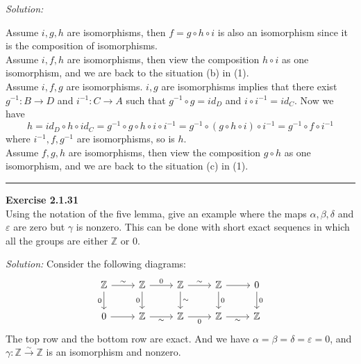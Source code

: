 \documentclass[a4paper, 12pt]{article}
\newenvironment{problem}[2][Exercise]
    { \begin{mdframed}[backgroundcolor=gray!20] \textbf{#1 #2} \\}
    {  \end{mdframed}}
\newenvironment{solution}
    {\textit{Solution:}}
    {}
\begin{document}
\begin{solution}
\begin{enumerate}[(1)]
Assume \(i,g,h\) are isomorphisms, then \(f=g\circ h\circ i\) is also an isomorphism since it is the composition of isomorphisms.\\ 
Assume \(i,f,h\) are isomorphisms, then view the composition \(h\circ i\) as one isomorphism, and we are back to the situation (b) in (1).\\ 
Assume \(i,f,g\) are isomorphisms. \(i,g\) are isomorphisms implies that there exist \(g^{-1}:B\rightarrow D\) and \(i^{-1}:C\rightarrow A\) such that \(g^{-1}\circ g=id_D\) and 
\(i\circ i^{-1}=id_C\). Now we have 
\[h=id_D\circ h\circ id_C=g^{-1}\circ g\circ h\circ i\circ i^{-1}=g^{-1}\circ (g\circ h\circ i)\circ i^{-1}=g^{-1}\circ f\circ i^{-1} \]
where \(i^{-1},f,g^{-1}\) are isomorphisms, so is \(h\).\\ 
Assume \(f,g,h\) are isomorphisms, then view the composition \(g\circ h\) as one isomorphism, and we are back to the situation (c) in (1).
\end{enumerate}
\end{solution}

\noindent\rule{7in}{2.8pt}
\begin{problem}{2.1.31}
Using the notation of the five lemma, give an example where the maps \(\alpha,\beta,\delta\) and \(\varepsilon\) are zero but \(\gamma\) is nonzero. 
This can be done with short exact sequencs in which all the groups are either \(\mathbb{Z}\) or \(0\).
\end{problem}
\begin{solution}
Consider the following diagrams:
\[\begin{tikzcd}
	{\mathbb{Z}} & {\mathbb{Z}} & {\mathbb{Z}} & {\mathbb{Z}} & 0 \\
	0 & {\mathbb{Z}} & {\mathbb{Z}} & {\mathbb{Z}} & {\mathbb{Z}}
	\arrow["\sim", from=1-1, to=1-2]
	\arrow["0"', from=1-1, to=2-1]
	\arrow["0", from=1-2, to=1-3]
	\arrow["0"', from=1-2, to=2-2]
	\arrow["\sim", from=1-3, to=1-4]
	\arrow["\sim", from=1-3, to=2-3]
	\arrow[from=1-4, to=1-5]
	\arrow["0", from=1-4, to=2-4]
	\arrow["0", from=1-5, to=2-5]
	\arrow[from=2-1, to=2-2]
	\arrow["\sim"', from=2-2, to=2-3]
	\arrow["0"', from=2-3, to=2-4]
	\arrow["\sim"', from=2-4, to=2-5]
\end{tikzcd}\]
The top row and the bottom row are exact. And we have \(\alpha=\beta=\delta=\varepsilon=0\), and \(\gamma:\mathbb{Z}\xrightarrow{\sim} \mathbb{Z}\) is an isomorphism and nonzero.
\end{solution}
\end{document}
